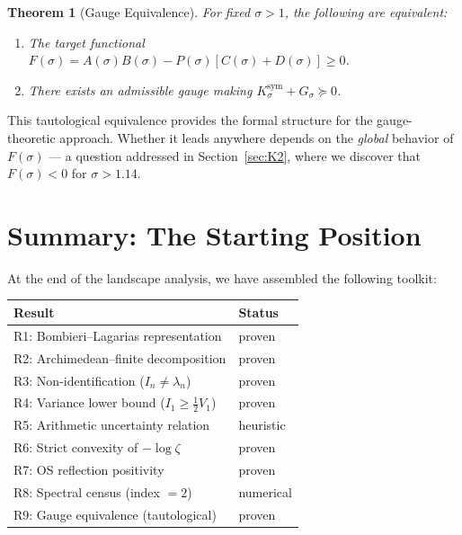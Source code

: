\documentclass[12pt,a4paper]{article}
\newtheorem{theorem}{Theorem}[section]
\theoremstyle{definition}
\theoremstyle{remark}
\newcommand{\Ksym}{K_\sigma^{\mathrm{sym}}}
\begin{document}
\begin{theorem}[Gauge Equivalence]
\label{thm:gauge}
For fixed $\sigma > 1$, the following are equivalent:
\begin{enumerate}[label=(\roman*)]
  \item The target functional $F(\sigma) = A(\sigma)B(\sigma) - P(\sigma)[C(\sigma)+D(\sigma)] \geq 0$.
  \item There exists an admissible gauge making $\Ksym + G_\sigma \succeq 0$.
\end{enumerate}
\end{theorem}

This tautological equivalence provides the formal structure for the gauge-theoretic approach. Whether it leads anywhere depends on the \emph{global} behavior of $F(\sigma)$ --- a question addressed in Section~\ref{sec:K2}, where we discover that $F(\sigma) < 0$ for $\sigma > 1.14$.


\section{Summary: The Starting Position}
\label{sec:summary}

At the end of the landscape analysis, we have assembled the following toolkit:

\begin{center}
\renewcommand{\arraystretch}{1.15}
\begin{tabular}{ll}
\toprule
\textbf{Result} & \textbf{Status} \\
\midrule
R1: Bombieri--Lagarias representation & proven \\
R2: Archimedean--finite decomposition & proven \\
R3: Non-identification ($I_n \neq \lambda_n$) & proven \\
R4: Variance lower bound ($I_1 \geq \frac{1}{2}V_1$) & proven \\
R5: Arithmetic uncertainty relation & heuristic \\
R6: Strict convexity of $-\log\zeta$ & proven \\
R7: OS reflection positivity & proven \\
R8: Spectral census (index $= 2$) & numerical \\
R9: Gauge equivalence (tautological) & proven \\
\bottomrule
\end{tabular}
\end{center}
\end{document}
